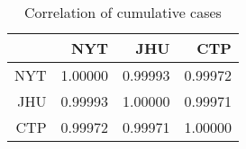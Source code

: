 \begin{table}[ht]
\centering
\begin{tabular}{rrrr}
  \hline
 & NYT & JHU & CTP \\ 
  \hline
NYT & 1.00000 & 0.99993 & 0.99972 \\ 
  JHU & 0.99993 & 1.00000 & 0.99971 \\ 
  CTP & 0.99972 & 0.99971 & 1.00000 \\ 
   \hline
\end{tabular}
\caption{Correlation of cumulative cases \label{tab:casecor}} 
\end{table}
